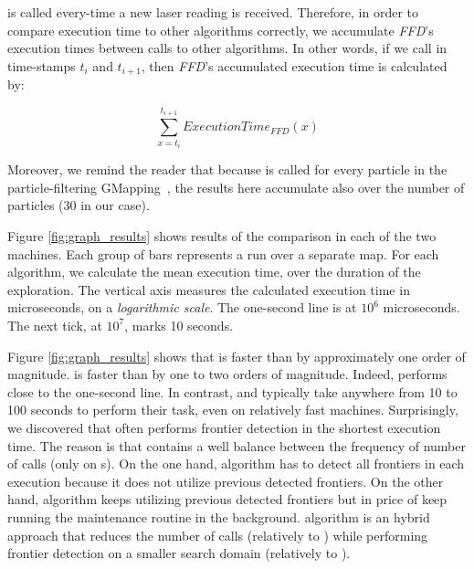 \FFD is called every-time a new laser reading is received. Therefore, in
order to compare \FFD execution time to other algorithms correctly, we
accumulate \emph{FFD}'s execution times between calls to other algorithms. In
other words, if we call \WFD in time-stamps $t_i$ and $t_{i+1}$, then
\emph{FFD}'s accumulated execution time is calculated by: 

\begin{displaymath}
\sum_{x = t_i}^{t_{i+1}}{ExecutionTime_{FFD}(x)}
\end{displaymath}

Moreover, we remind the reader that because \FFD is called for every particle
in the particle-filtering GMapping~\cite{grisetti07tro},
the results here accumulate also over the number of particles (30 in our case).

Figure \ref{fig:graph_results} shows
results of the comparison in each of the two machines. Each
group of bars represents a run over a separate map. For each algorithm, we
calculate the mean execution time, over the duration of the exploration. The vertical axis
measures the calculated execution time in microseconds, on a \emph{logarithmic scale}.
The one-second line is at $10^6$ microseconds. The next tick, at $10^7$, marks
10 seconds.

Figure \ref{fig:graph_results} shows that \WFD is faster than \SOTA
by approximately one order of magnitude. \FFD is faster than \WFD by
one to two orders of magnitude. Indeed, \FFD performs close to the one-second
line.  In contrast, \WFD and \SOTA typically take anywhere from 10 to 100 seconds
to perform their task, even on relatively fast machines. Surprisingly, we
discovered that \WFDIP often performs frontier detection in the shortest
execution time. The reason is that \WFDIP contains a well balance between the
frequency of number of calls (only on \mapevent s). On the one hand, \WFD
algorithm has to detect all frontiers in each execution because it does not
utilize previous detected frontiers. On the other hand, \FFD algorithm keeps
utilizing previous detected frontiers but in price of keep running the
maintenance routine in the background. \WFDIP algorithm is an hybrid approach
that reduces the number of calls (relatively to \FFD) while performing frontier
detection on a smaller search domain (relatively to \WFD).

